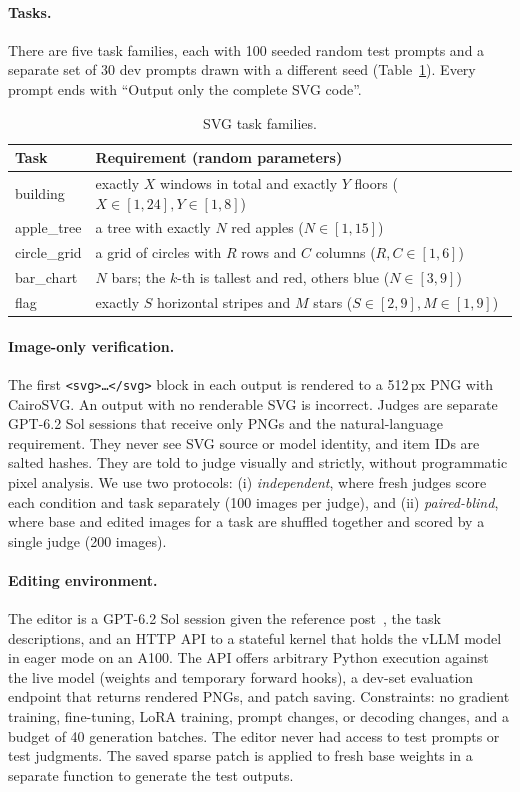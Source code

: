 \documentclass[11pt]{article}
\begin{document}
\paragraph{Tasks.} There are five task families, each with 100 seeded random test prompts and a separate set of 30 dev prompts drawn with a different seed (Table~\ref{tab:tasks}). Every prompt ends with ``Output only the complete SVG code''.
\begin{table}[h]\centering\small
\begin{tabular}{ll}\toprule
Task & Requirement (random parameters)\\\midrule
building & exactly $X$ windows in total and exactly $Y$ floors ($X\in[1,24],Y\in[1,8]$)\\
apple\_tree & a tree with exactly $N$ red apples ($N\in[1,15]$)\\
circle\_grid & a grid of circles with $R$ rows and $C$ columns ($R,C\in[1,6]$)\\
bar\_chart & $N$ bars; the $k$-th is tallest and red, others blue ($N\in[3,9]$)\\
flag & exactly $S$ horizontal stripes and $M$ stars ($S\in[2,9],M\in[1,9]$)\\\bottomrule
\end{tabular}\caption{SVG task families.}\label{tab:tasks}\end{table}

\paragraph{Image-only verification.} The first \texttt{<svg>\ldots</svg>} block in each output is rendered to a 512\,px PNG with CairoSVG. An output with no renderable SVG is incorrect. Judges are separate GPT-6.2 Sol sessions that receive only PNGs and the natural-language requirement. They never see SVG source or model identity, and item IDs are salted hashes. They are told to judge visually and strictly, without programmatic pixel analysis.
We use two protocols: (i) \emph{independent}, where fresh judges score each condition and task separately (100 images per judge), and (ii) \emph{paired-blind}, where base and edited images for a task are shuffled together and scored by a single judge (200 images).

\paragraph{Editing environment.} The editor is a GPT-6.2 Sol session given the reference post~\cite{wsp}, the task descriptions, and an HTTP API to a stateful kernel that holds the vLLM model in eager mode on an A100. The API offers arbitrary Python execution against the live model (weights and temporary forward hooks), a dev-set evaluation endpoint that returns rendered PNGs, and patch saving.
Constraints: no gradient training, fine-tuning, LoRA training, prompt changes, or decoding changes, and a budget of 40 generation batches. The editor never had access to test prompts or test judgments. The saved sparse patch is applied to fresh base weights in a separate function to generate the test outputs.
\end{document}
